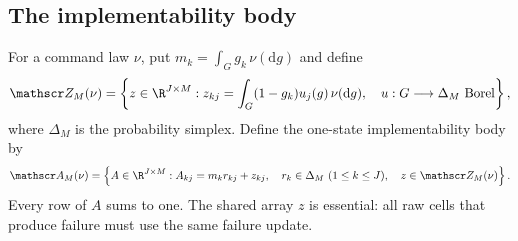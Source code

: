 \subsection{The implementability body}
For a command law $\nu$, put $m_k=\int_G g_k\,\nu(\mathrm dg)$ and define
\begin{equation}\label{eq:v33-allocation}
 \mathscr Z_M(\nu)=\left\{z\in\R^{J\times M}:
 z_{kj}=\int_G(1-g_k)u_j(g)\,\nu(\mathrm dg),\quad
 u:G\longrightarrow\Delta_M\ \hbox{Borel}\right\},
\end{equation}
where $\Delta_M$ is the probability simplex. Define the one-state
implementability body by
\begin{equation}\label{eq:v33-body}
 \mathscr A_M(\nu)=
 \left\{ A\in\R^{J\times M}: A_{kj}=m_k r_{kj}+z_{kj},\quad
       r_k\in\Delta_M\ (1\le k\le J),\quad z\in\mathscr Z_M(\nu)\right\}.
\end{equation}
Every row of $A$ sums to one. The shared array $z$ is essential: all
raw cells that produce failure must use the same failure update.


